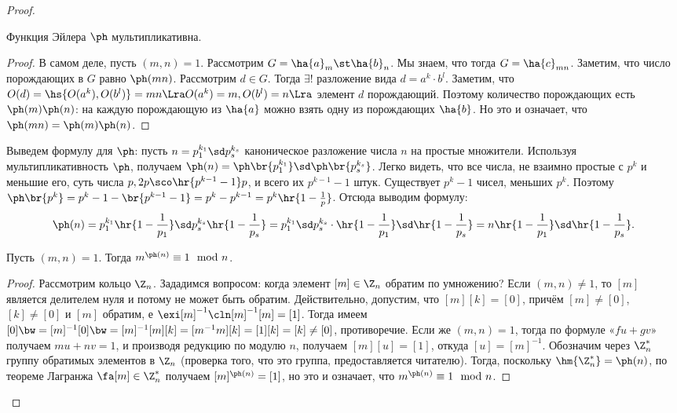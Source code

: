\documentclass[a4paper]{article}
\begin{document}
\begin{proof}
\begin{theorem}
Функция Эйлера $\ph$ мультипликативна.
\end{theorem}
\begin{proof}
В самом деле, пусть $(m,n)=1$. Рассмотрим $G = \ha{a}_m\st\ha{b}_n$. Мы знаем,  что тогда $G = \ha{c}_{mn}$.
Заметим, что число порождающих в $G$ равно $\ph(mn)$. Рассмотрим $d \in G$. Тогда $\exi!$ разложение вида
$d=a^k\cdot b^l$. Заметим, что $O(d)=\hs{O(a^k), O(b^l)} = mn \Lra O(a^k) =m, O(b^l)=n \Lra$ элемент $d$
порождающий. Поэтому количество порождающих есть $\ph(m)\ph(n)$: на каждую порождающую из $\ha{a}$ можно
взять одну из порождающих $\ha{b}$. Но это и означает, что $\ph(mn)=\ph(m)\ph(n)$.
\end{proof}

Выведем формулу для $\ph$: пусть $n=p_1^{k_1}\sd p_s^{k_s}$ каноническое  разложение числа $n$ на простые
множители. Используя мультипликативность $\ph$, получаем $\ph(n)=\ph\br{p_1^{k_1}}\sd \ph\br{p_s^{k_s}}$.
Легко видеть, что все числа, не взаимно простые с $p^k$ и меньшие его, суть числа $p,2p\sco \hr{p^{k-1}-1}p$,
и всего их $p^{k-1}-1$ штук. Существует $p^k-1$ чисел, меньших $p^k$. Поэтому $\ph\br{p^k}=p^k-1 -
\br{p^{k-1}-1}=p^k-p^{k-1}=p^k\hr{1-\frac{1}{p}}$. Отсюда выводим формулу:
$$\ph(n)=p_1^{k_1}\hr{1-\frac{1}{p_1}}\sd p_s^{k_s}\hr{1-\frac{1}{p_s}}= p_1^{k_1}\sd
p_s^{k_s}\cdot\hr{1-\frac{1}{p_1}}\sd\hr{1-\frac{1}{p_s}}=n\hr{1-\frac{1}{p_1}}\sd \hr{1-\frac{1}{p_s}}.$$

\begin{theorem}
Пусть $(m,n)=1$. Тогда $m^{\ph(n)}\equiv 1 \mod n$.
\end{theorem}
\begin{proof}
Рассмотрим кольцо $\Z_n$. Зададимся вопросом: когда элемент $[m] \in \Z_n$ обратим по умножению? Если
$(m,n)\neq 1$, то $[m]$ является делителем нуля и потому не может быть обратим. Действительно, допустим, что
$[m][k] = [0]$, причём $[m] \neq [0]$, $[k] \neq [0]$ и $[m]$ обратим, е $\exi [m]^{-1}\cln [m]^{-1}[m]=[1]$.
Тогда имеем $[0]\bw=[m]^{-1}[0]\bw=[m]^{-1}[m][k]=[m^{-1}m][k]=[1][k]=[k]\neq [0]$, противоречие. Если же
$(m,n)=1$, тогда по формуле «$fu+gv$» получаем $mu+nv=1$, и производя редукцию по модулю $n$, получаем
$[m][u]=[1]$, откуда $[u]=[m]^{-1}$. Обозначим через $\Z_n^*$ группу обратимых элементов в $\Z_n$ (проверка
того, что это группа, предоставляется читателю). Тогда, поскольку $\hm{\Z_n^*}=\ph(n)$, по теореме Лагранжа
$\fa [m] \in \Z_n^*$ получаем  $[m]^{\ph(n)}=[1]$, но это и означает, что $m^{\ph(n)} \equiv 1 \mod n$.
\end{proof}


\end{proof}
\end{document}
